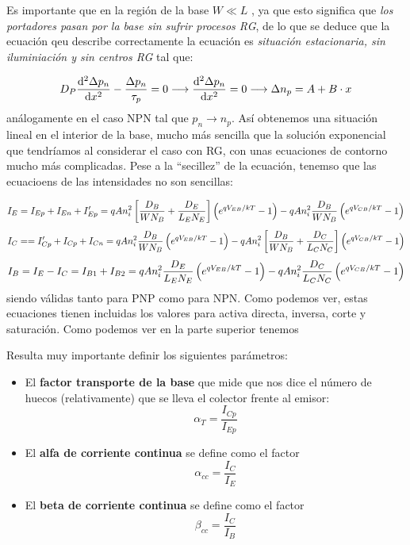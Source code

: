 Es importante que en la región de la base $W \ll L$ , ya que esto significa que \textit{los portadores pasan por la base sin sufrir procesos RG}, de lo que se deduce que la ecuación qeu describe correctamente la ecuación es \textit{situación estacionaria, sin iluminiación y sin centros RG} tal que:

\begin{equation*}
    D_P \frac{\mathrm{d} ^2 \Delta p_n}{\mathrm{d} x^2} - \frac{\Delta p_n}{\tau_p} = 0 \longrightarrow \frac{\mathrm{d} ^2 \Delta p_n}{\mathrm{d} x^2} = 0  \longrightarrow \Delta n_p  = A + B \cdot x
\end{equation*}
análogamente en el caso NPN tal que $p_n\to n_p$. Así obtenemos una situación lineal en el interior de la base, mucho más sencilla que la solución exponencial que tendríamos al considerar el caso con RG, con unas ecuaciones de contorno mucho más complicadas. Pese a la ``secillez'' de la ecuación, tenemso que las ecuacioens de las intensidades no son sencillas: 

\begin{equation}
    I_E = I_{Ep} + I_{En} + I_{Ep}' =  q A n_i^2 \left[ \frac{D_B}{WN_B} + \frac{D_E}{L_EN_E} \right] \left( e^{qV_{EB}/kT}-1 \right) - q A n_i^2 \frac{D_B}{WN_B} \left( e^{qV_{CB}/kT}-1 \right)
\end{equation}
\begin{equation}
    I_C =  = I_{Cp}' + I_{Cp} + I_{Cn} =  q A n_i^2 {\frac{D_B}{WN_B}} \left( e^{qV_{EB}/kT}-1 \right) - q A n_i^2 \left[  \frac{D_B}{WN_B} + \frac{D_C}{L_CN_C}  \right] \left( e^{qV_{CB}/kT}-1 \right)
\end{equation}
\begin{equation}
    I_B = I_E - I_C = I_{B1} + I_{B2} = q A n_i^2 \frac{D_E}{L_EN_E} \left( e^{qV_{EB}/kT}-1 \right) - q A n_i^2\frac{D_C}{L_C N_C} \left( e^{qV_{CB}/kT}-1 \right)
\end{equation}
siendo válidas tanto para PNP como para NPN. Como podemos ver, estas ecuaciones tienen incluidas los valores para activa directa, inversa, corte y saturación. Como podemos ver en la parte superior tenemos 


Resulta muy importante definir los siguientes parámetros:

\begin{itemize}
    \item El \textbf{factor transporte de la base} que mide que nos dice el número de huecos (relativamente) que se lleva el colector frente al emisor:
    \begin{equation}
        \alpha_T = \frac{I_{Cp}}{I_{Ep}}
    \end{equation}
    \item El \textbf{alfa de corriente continua} se define como el factor 
    \begin{equation}
        \alpha_{cc} = \frac{I_C}{I_E}
    \end{equation}
    \item El \textbf{beta de corriente continua} se define como el factor
    \begin{equation}
        \beta_{cc} = \frac{I_C}{I_B}
    \end{equation}
\end{itemize}

